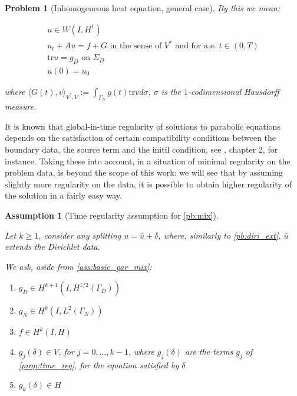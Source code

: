 \documentclass[english,a4paper,9pt,oneside]{scrbook}	%
\theoremstyle{break}
\newtheorem{ass}[equation]{Assumption}
\newtheorem{pb}[equation]{Problem}
\theoremstyle{remark}
\newcommand{\ds}{\displaystyle}
\newcommand{\tr}{\text{tr}}
\begin{document}
\begin{appendices}
\begin{pb}[Inhomogeneous heat equation, general case]
By this we mean:

\begin{align*}
u \in W(I,H^1) \\
u_t + A u = f + G \text{ in the sense of } V^* \text{ and for a.e. } t \in (0,T) \\
\tr u =g_D \text{ on } \Sigma_D\\
u(0)=u_0
\end{align*}

where $\ds \langle G(t), v \rangle_{V^*,V}:=\int_{\Gamma_N} g(t)\tr v d\sigma$, $\sigma$ is the $1$-codimensional Hausdorff measure.

\end{pb}

It is known that global-in-time regularity of solutions to parabolic equations depends on the satisfaction of certain compatibility conditions between the boundary data, the source term and the initil condition, see \cite{lions}, chapter 2, for instance. Taking these into account, in a situation of minimal regularity on the problem data, is beyond the scope of this work: we will see that by assuming slightly more regularity on the data, it is possible to obtain higher regularity of the solution in a fairly easy way.


\begin{ass}[Time regularity assumption for \cref{pb:mix}]
\label{ass:time_reg_mix}

Let $k\geq 1$, consider any splitting $u = \bar{u} + \delta$, where, similarly to \cref{pb:diri_ext}, $\bar{u}$ extends the Dirichlet data.

We ask, aside from \cref{ass:basic_par_mix}:

\begin{enumerate}
	\item $g_D \in H^{k+1}(I, H^{1/2}(\Gamma_D))$
	\item $g_N \in H^{k}(I, L^2(\Gamma_N))$
	\item $f \in H^k(I, H)$
	\item $g_j(\delta)  \in V$, for $j=0,...,k-1$, where $g_j(\delta)$ are the terms $g_j$ of \cref{prop:time_reg}, for the equation satisfied by $\delta$
	\item $g_k(\delta) \in H$
\end{enumerate}
\end{ass}


\end{appendices}
\end{document}
